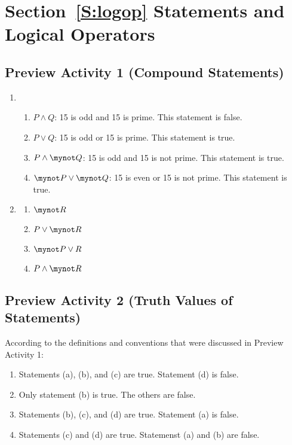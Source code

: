 \section*{Section~\ref{S:logop} Statements and Logical Operators}

\subsection*{Preview Activity 1 (Compound Statements)}
\begin{enumerate}
  \item \begin{enumerate}
    \item $P \wedge Q$:  15 is odd and 15 is prime.  This statement is false.
    \item $P \vee Q$:  15 is odd or 15 is prime.  This statement is true.
    \item $P \wedge \mynot Q$:  15 is odd and 15 is not prime.  This statement is true.
    \item $\mynot P \vee \mynot Q$:  15 is even or 15 is not prime.  This statement is true.
  \end{enumerate}


  \item \begin{multicols}{2} \begin{enumerate}
    \item $\mynot R$
    \item $P \vee \mynot R$
    \item $\mynot P \vee R$
    \item $P \wedge \mynot R$
  \end{enumerate} \end{multicols}
\end{enumerate}
\hbreak
%
%
\subsection*{Preview Activity 2 (Truth Values of Statements)}

According to the definitions and conventions that were discussed in Preview Activity 1:

\begin{enumerate}
\item Statements (a), (b), and (c) are true.  Statement (d) is false.

\item Only statement (b) is true.  The others are false.

\item Statements (b), (c), and (d) are true.  Statement (a) is false.

\item Statements (c) and (d) are true.  Statemenst (a) and (b) are false.
\end{enumerate}
\hbreak
\newpage

\endinput
